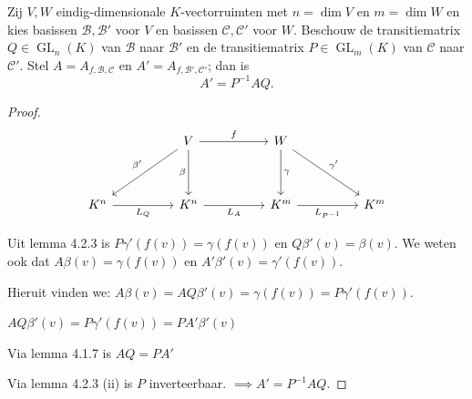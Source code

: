 \begin{stelling}[4.2.5]
    Zij $V, W$ eindig-dimensionale $K$-vectorruimten met $n = \dim V$ en $m = \dim W$ en kies basissen $\mathcal{B}, \mathcal{B}'$ voor $V$ en basissen $\mathcal{C}, \mathcal{C}'$ voor $W$. Beschouw de transitiematrix $Q \in \operatorname{GL}_n(K)$ van $\mathcal{B}$ naar $\mathcal{B}'$ en de transitiematrix $P \in \operatorname{GL}_m(K)$ van $\mathcal{C}$ naar $\mathcal{C}'$. Stel $A = A_{f,\mathcal{B},\mathcal{C}}$ en $A' = A_{f,\mathcal{B}',\mathcal{C}'}$; dan is
    \[ A' = P^{-1}AQ. \]
\end{stelling}
\begin{proof}
    \begin{equation*}
    \begin{tikzcd}[row sep=huge, column sep=huge]
        & V \arrow[r, "f"] \arrow[dl, "\beta'"'] \arrow[d, "\beta"'] & W \arrow[d, "\gamma"] \arrow[dr, "\gamma'"] & \\
        K^n \arrow[r, "L_Q"'] & K^n  \arrow[r, "L_A"']  &  K^m \arrow[r, "L_{P^{-1}}"'] & K^m
    \end{tikzcd}
    \end{equation*}

    Uit lemma 4.2.3 is \(P \gamma'(f(v)) = \gamma(f(v))\) en \(Q \beta'(v) = \beta(v) \).
    We weten ook dat \(A \beta (v) = \gamma (f(v))\) en \(A' \beta'(v) = \gamma' (f(v))\).

    Hieruit vinden we: \(A \beta (v)= A Q \beta'(v)  = \gamma (f(v)) = P \gamma'(f(v))\).

    \(A Q \beta'(v) = P \gamma'(f(v)) = PA' \beta'(v)\)

    Via lemma 4.1.7 is \(AQ = PA'\)

    Via lemma 4.2.3 (ii) is \( P\) inverteerbaar.
    \(\implies A' = P^{-1}AQ\).

\end{proof}

